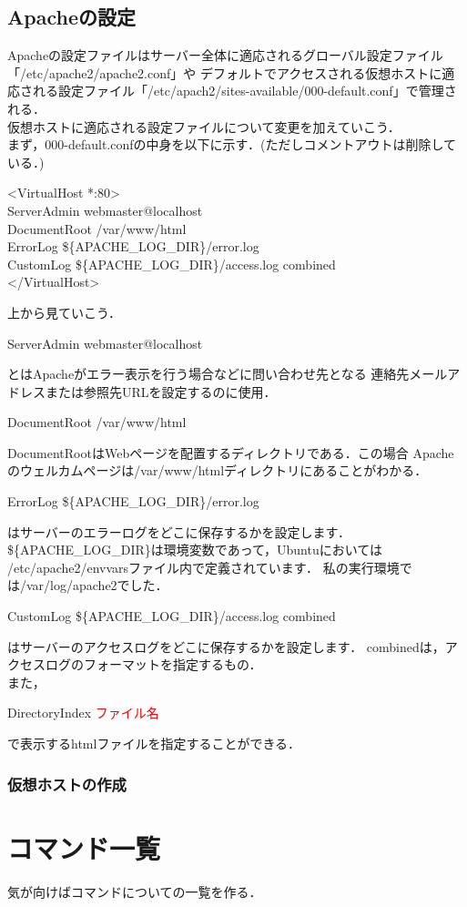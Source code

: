 \documentclass[dvipdfmx,a4paper,11pt]{jsbook}
\begin{document}
\section{Apacheの設定}
Apacheの設定ファイルはサーバー全体に適応されるグローバル設定ファイル「/etc/apache2/apache2.conf」や
デフォルトでアクセスされる仮想ホストに適応される設定ファイル「/etc/apach2/sites-available/000-default.conf」で管理される．\\
仮想ホストに適応される設定ファイルについて変更を加えていこう．\\
まず，000-default.confの中身を以下に示す．(ただしコメントアウトは削除している．)
\begin{tcolorbox}[terminalbox]
  <VirtualHost *:80>\\
  \qquad ServerAdmin webmaster@localhost\\
  \qquad  DocumentRoot /var/www/html\\
  \qquad  ErrorLog \$\{APACHE\_LOG\_DIR\}/error.log\\
  \qquad  CustomLog \$\{APACHE\_LOG\_DIR\}/access.log combined\\
  </VirtualHost>
\end{tcolorbox}
上から見ていこう．
\begin{tcolorbox}[terminalbox]
  ServerAdmin webmaster@localhost
\end{tcolorbox}
とはApacheがエラー表示を行う場合などに問い合わせ先となる
連絡先メールアドレスまたは参照先URLを設定するのに使用．
\begin{tcolorbox}[terminalbox]
  DocumentRoot /var/www/html
\end{tcolorbox}
DocumentRootはWebページを配置するディレクトリである．この場合
Apacheのウェルカムページは/var/www/htmlディレクトリにあることがわかる．
\begin{tcolorbox}[terminalbox]
  ErrorLog \$\{APACHE\_LOG\_DIR\}/error.log
\end{tcolorbox}
はサーバーのエラーログをどこに保存するかを設定します．
\$\{APACHE\_LOG\_DIR\}は環境変数であって，Ubuntuにおいては
/etc/apache2/envvarsファイル内で定義されています．
私の実行環境では/var/log/apache2でした．
\begin{tcolorbox}[terminalbox]
  CustomLog \$\{APACHE\_LOG\_DIR\}/access.log combined
\end{tcolorbox}
はサーバーのアクセスログをどこに保存するかを設定します．
combinedは，アクセスログのフォーマットを指定するもの．\\
また，
\begin{tcolorbox}[terminalbox]
  DirectoryIndex \textcolor{red}{ファイル名}
\end{tcolorbox}
で表示するhtmlファイルを指定することができる．

\subsection{仮想ホストの作成}






\appendix
\chapter{コマンド一覧}
気が向けばコマンドについての一覧を作る．
\end{document}
